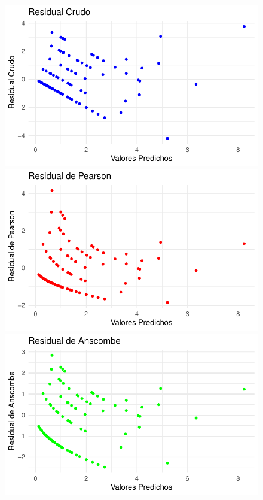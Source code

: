 \documentclass[
  letterpaper,
  DIV=11,
  numbers=noendperiod]{scrartcl}
\begin{document}
\begin{figure}

\begin{minipage}{0.50\linewidth}
\includegraphics{Modelos_files/figure-pdf/unnamed-chunk-37-1.pdf}\end{minipage}%
%
\begin{minipage}{0.50\linewidth}
\includegraphics{Modelos_files/figure-pdf/unnamed-chunk-37-2.pdf}\end{minipage}%
\newline
\begin{minipage}{0.50\linewidth}
\includegraphics{Modelos_files/figure-pdf/unnamed-chunk-37-3.pdf}\end{minipage}%

\end{figure}
\end{document}
